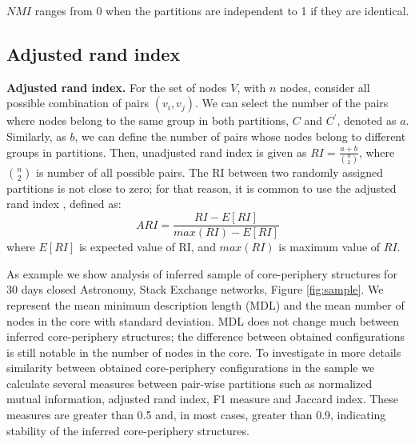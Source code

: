 $NMI$ ranges from 0 when the partitions are independent to 1 if they are identical.   

\subsection{Adjusted rand index}

\textbf{Adjusted rand index.} For the set of nodes $V$, with $n$ nodes, consider all possible combination of pairs $(v_i, v_j)$. We can select the number of the pairs where nodes belong to the same group in both partitions, $C$ and  $C^{'}$, denoted as $a$. Similarly, as $b$, we can define the number of pairs whose nodes belong to different groups in partitions. Then, unadjusted rand index \cite{santos2009use} is given as $RI = \frac{a+b}{\binom{n}{2}}$, where $\binom{n}{2}$ is number of all possible pairs. The RI between two randomly assigned partitions is not close to zero; for that reason, it is common to use the adjusted rand index \cite{hubert1985comparing} , defined as:
\begin{equation}
ARI = \frac{RI - E[RI]}{max(RI)- E[RI]}
\end{equation}
where $E[RI]$ is expected value of RI, and $max(RI)$ is maximum value of $RI$. 


As example we show analysis of inferred sample of  core-periphery structures for 30 days closed Astronomy, Stack Exchange networks, Figure \ref{fig:sample}. We represent the mean minimum description length (MDL) and the mean number of nodes in the core with standard deviation. MDL does not change much between inferred core-periphery structures; the difference between obtained configurations is still notable in the number of nodes in the core.  To investigate in more details similarity between obtained core-periphery configurations in the sample we calculate several measures between pair-wise partitions such as normalized mutual information, adjusted rand index, F1 measure and Jaccard index. These measures are greater than 0.5 and, in most cases, greater than 0.9, indicating stability of the inferred core-periphery structures.


